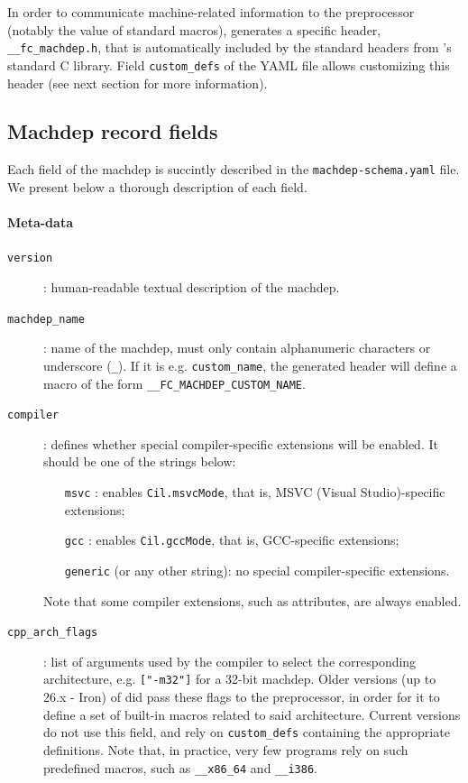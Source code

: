 In order to communicate machine-related information to the preprocessor (notably
the value of standard macros), \framac generates a specific header,
\verb+__fc_machdep.h+, that is automatically included by the standard headers from
\framac's standard C library. Field \verb+custom_defs+ of the YAML file allows
customizing this header (see next section for more information).

\subsection{Machdep record fields}\label{sec:machdep-fields}

Each field of the machdep is succintly described in the
\verb+machdep-schema.yaml+ file.
We present below a thorough description of each field.

\paragraph{Meta-data}
\begin{description}
\item[\texttt{version}]: human-readable textual description of the machdep.
\item[\texttt{machdep\_name}]: name of the machdep, must only contain alphanumeric
  characters or underscore (\verb+_+). If it is e.g. \verb+custom_name+, the generated header will
  define a macro of the form \verb+__FC_MACHDEP_CUSTOM_NAME+.
\item[\texttt{compiler}]: defines whether special compiler-specific extensions
  will be enabled. It should be one of the strings below:
  \begin{itemize}
  \item[\texttt{msvc}]: enables \verb+Cil.msvcMode+, that is,
    MSVC (Visual Studio)-specific extensions;
  \item[\texttt{gcc}]: enables \verb+Cil.gccMode+, that is,
    GCC-specific extensions;
  \item[\texttt{generic}] (or any other string): no special
    compiler-specific extensions.
  \end{itemize}
  Note that some compiler extensions, such as attributes, are always enabled.
\item[\texttt{cpp\_arch\_flags}]: list of arguments used by the compiler to
  select the corresponding architecture, e.g. \verb+["-m32"]+ for a 32-bit
  machdep. Older versions (up to 26.x - Iron) of \framac did pass these flags to the preprocessor,
  in order for it to define a set of built-in macros related to said architecture.
  Current versions do not use this field, and rely on \texttt{\texttt{custom\_defs}}
  containing the appropriate definitions.
  Note that, in practice, very few programs rely on such predefined macros,
  such as \verb+__x86_64+ and \verb+__i386+.
\end{description}
